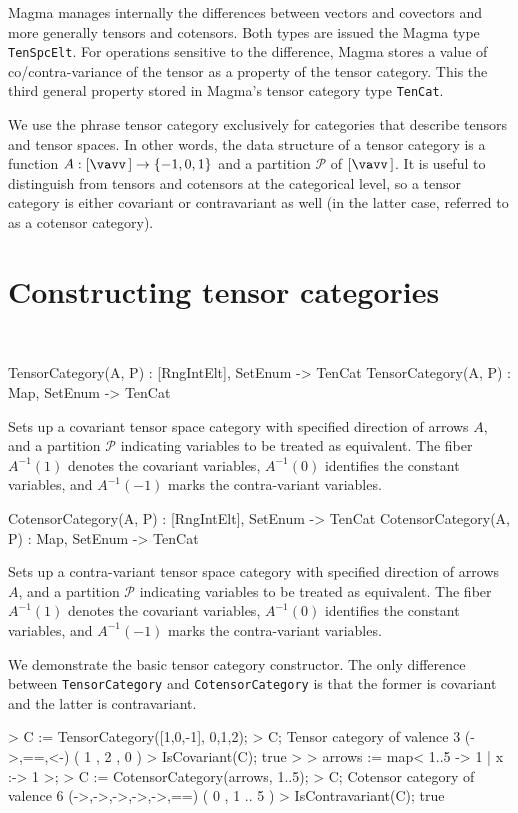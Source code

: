 Magma manages internally the differences between 
vectors and covectors and more generally tensors and cotensors.
Both types are issued the Magma type {\tt TenSpcElt}.
For operations sensitive to the difference, Magma stores a value of
co/contra-variance of the tensor as a property of the tensor category.
This the third general property stored in Magma's tensor category type
{\tt TenCat}.

We use the phrase tensor category exclusively for categories that describe tensors and tensor spaces.
In other words, the data structure of a tensor category is a function 
$A:[\vav]\rightarrow \{-1,0,1\}$ and a partition $\mathcal{P}$ of $[\vav]$.
It is useful to distinguish from tensors and cotensors at the categorical level,
so a tensor category is either covariant or contravariant as well 
(in the latter case, referred to as a cotensor category).

\section{Constructing tensor categories}~

\begin{intrinsics}
TensorCategory(A, P) : [RngIntElt], {SetEnum} -> TenCat
TensorCategory(A, P) : Map, {SetEnum} -> TenCat
\end{intrinsics}

Sets up a covariant tensor space category with specified direction of
arrows $A$, and a partition $\mathcal{P}$ indicating variables to be treated as
equivalent.  The fiber $A^{-1}(1)$ denotes the covariant variables,
$A^{-1}(0)$ identifies the constant variables, and $A^{-1}(-1)$ marks
the contra-variant variables.  

\begin{intrinsics}
CotensorCategory(A, P) : [RngIntElt], {SetEnum} -> TenCat
CotensorCategory(A, P) : Map, {SetEnum} -> TenCat
\end{intrinsics}

Sets up a contra-variant tensor space category with specified direction of
arrows $A$, and a partition $\mathcal{P}$ indicating variables to be treated as
equivalent.  The fiber $A^{-1}(1)$ denotes the covariant variables,
$A^{-1}(0)$ identifies the constant variables, and $A^{-1}(-1)$ marks
the contra-variant variables.  

\begin{example}[BasicCatConst]

We demonstrate the basic tensor category constructor. 
The only difference between \texttt{TensorCategory} and \texttt{CotensorCategory} is that the former is covariant and the latter is contravariant.
\begin{code}
> C := TensorCategory([1,0,-1], {{0},{1},{2}});
> C;
Tensor category of valence 3 (->,==,<-) ({ 1 },{ 2 },{ 0 })
> IsCovariant(C);
true
> 
> arrows := map< {1..5} -> {1} | x :-> 1 >;
> C := CotensorCategory(arrows, {{1..5}});
> C;
Cotensor category of valence 6 (->,->,->,->,->,==) ({ 0 },{ 1 .. 5 })
> IsContravariant(C);
true
\end{code}
\end{example}


